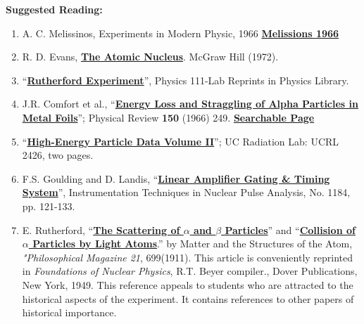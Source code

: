 \documentclass{../lab}
\begin{document}
\noindent\textbf{Suggested Reading:}

\begin{enumerate}
    \item A. C. Melissinos, Experiments in Modern Physic, 1966 \href{http://physics111.lib.berkeley.edu/Physics111/Reprints/RUT/RUT\%20\%20melissinos\%201966\%20rutherford\%20scattering.pdf}{\textbf{Melissions 1966}}

    \item R. D. Evans, \href{http://physics111.lib.berkeley.edu/Physics111/Reprints/R.D.Evans\%20Atomic\%20Nucleus/The\%20Atomic\%20Nucleus\%20Evans\%20full\%20text.pdf}{\textbf{The Atomic Nucleus}}. McGraw Hill (1972).

    \item ``\href{http://physics111.lib.berkeley.edu/Physics111/Reprints/RUT/03-Physics\_111\_Rutherford\_Scattering\_Experiment.pdf}{\textbf{Rutherford Experiment}}'', Physics 111-Lab Reprints in Physics Library.

    \item J.R. Comfort et al., ``\href{http://prola.aps.org/abstract/PR/v150/i1/p249\_1}{\textbf{Energy Loss and Straggling of Alpha Particles in Metal Foils}}''; Physical Review \textbf{150} (1966) 249. \href{http://physics111.lib.berkeley.edu/Physics111/Reprints/RUT/01-Energy\_Loss\_and\_Straggling.pdf}{\textbf{Searchable Page}}

    \item ``\href{http://physics111.lib.berkeley.edu/Physics111/Reprints/RUT/02-High\_Energy\_Particle\_Data.pdf}{\textbf{High-Energy Particle Data Volume II}}''; UC Radiation Lab: UCRL 2426, two pages.

    \item F.S. Goulding and D. Landis, ``\href{http://physics111.lib.berkeley.edu/Physics111/Reprints/RUT/04-Linear\_Amplifier.pdf}{\textbf{Linear Amplifier Gating \& Timing System}}'', Instrumentation Techniques in Nuclear Pulse Analysis, No. 1184, pp. 121-133.

    \item E. Rutherford, ``\href{http://web.ihep.su/dbserv/compas/src/rutherford11/eng.pdf}{\textbf{The Scattering of $ \alpha $ and $ \beta $ Particles}}'' and ``\href{http://web.ihep.su/dbserv/compas/src/rutherford19/eng.pdf}{\textbf{Collision of $ \alpha $ Particles by Light Atoms}}.'' by Matter and the Structures of the Atom, \emph{"Philosophical Magazine 21}, 699(1911). This article is conveniently reprinted in\emph{ Foundations of Nuclear Physics}, R.T. Beyer compiler., Dover Publications, New York, 1949. This reference appeals to students who are attracted to the historical aspects of the experiment. It contains references to other papers of historical importance.

\end{enumerate}
\end{document}
